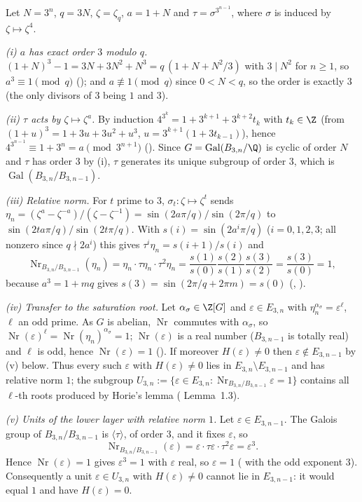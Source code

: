 Let $N=3^n$, $q=3N$, $\zeta=\zeta_q$, $a=1+N$ and $\tau=\sigma^{3^{n-1}}$, where $\sigma$ is induced by $\zeta\mapsto\zeta^4$.

\emph{(i) $a$ has exact order $3$ modulo $q$.} $(1+N)^3-1=3N+3N^2+N^3=q\,(1+N+N^2/3)$ with $3\mid N^2$ for $n\ge1$, so $a^3\equiv1\pmod q$ (); and $a\not\equiv1\pmod q$ since $0<N<q$, so the order is exactly $3$ (the only divisors of $3$ being $1$ and $3$).

\emph{(ii) $\tau$ acts by $\zeta\mapsto\zeta^{a}$.} By induction $4^{3^k}=1+3^{k+1}+3^{k+2}t_k$ with $t_k\in\Z$ (from $(1+u)^3=1+3u+3u^2+u^3$, $u=3^{k+1}(1+3t_{k-1})$), hence $4^{3^{n-1}}\equiv1+3^n=a\pmod{3^{n+1}}$ (). Since $G=\operatorname{Gal}(B_{3,n}/\Q)$ is cyclic of order $N$ and $\tau$ has order $3$ by (i), $\tau$ generates its unique subgroup of order $3$, which is $\operatorname{Gal}(B_{3,n}/B_{3,n-1})$.

\emph{(iii) Relative norm.} For $t$ prime to $3$, $\sigma_t:\zeta\mapsto\zeta^t$ sends $\eta_n=(\zeta^{a}-\zeta^{-a})/(\zeta-\zeta^{-1})=\sin(2a\pi/q)/\sin(2\pi/q)$ to $\sin(2ta\pi/q)/\sin(2t\pi/q)$. With $s(i)=\sin(2a^i\pi/q)$ ($i=0,1,2,3$; all nonzero since $q\nmid 2a^i$) this gives $\tau^i\eta_n=s(i+1)/s(i)$ and
\[ \operatorname{Nr}_{B_{3,n}/B_{3,n-1}}(\eta_n)=\eta_n\cdot\tau\eta_n\cdot\tau^2\eta_n=\frac{s(1)}{s(0)}\frac{s(2)}{s(1)}\frac{s(3)}{s(2)}=\frac{s(3)}{s(0)}=1, \]
because $a^3=1+mq$ gives $s(3)=\sin(2\pi/q+2\pi m)=s(0)$ (, ).

\emph{(iv) Transfer to the saturation root.} Let $\alpha_\sigma\in\Z[G]$ and $\varepsilon\in E_{3,n}$ with $\eta_n^{\alpha_\sigma}=\varepsilon^{\ell}$, $\ell$ an odd prime. As $G$ is abelian, $\operatorname{Nr}$ commutes with $\alpha_\sigma$, so $\operatorname{Nr}(\varepsilon)^{\ell}=\operatorname{Nr}(\eta_n)^{\alpha_\sigma}=1$; $\operatorname{Nr}(\varepsilon)$ is a real number ($B_{3,n-1}$ is totally real) and $\ell$ is odd, hence $\operatorname{Nr}(\varepsilon)=1$ (). If moreover $H(\varepsilon)\ne0$ then $\varepsilon\notin E_{3,n-1}$ by (v) below. Thus every such $\varepsilon$ with $H(\varepsilon)\neq0$ lies in $E_{3,n}\setminus E_{3,n-1}$ and has relative norm $1$; the subgroup $U_{3,n}:=\{\varepsilon\in E_{3,n}:\operatorname{Nr}_{B_{3,n}/B_{3,n-1}}\varepsilon=1\}$ contains all $\ell$-th roots produced by Horie's lemma (\cite{MO13} Lemma~1.3).

\emph{(v) Units of the lower layer with relative norm $1$.} Let $\varepsilon\in E_{3,n-1}$. The Galois group of $B_{3,n}/B_{3,n-1}$ is $\langle\tau\rangle$, of order $3$, and it fixes $\varepsilon$, so
\[ \operatorname{Nr}_{B_{3,n}/B_{3,n-1}}(\varepsilon)=\varepsilon\cdot\tau\varepsilon\cdot\tau^2\varepsilon=\varepsilon^3 . \]
Hence $\operatorname{Nr}(\varepsilon)=1$ gives $\varepsilon^3=1$ with $\varepsilon$ real, so $\varepsilon=1$ ( with the odd exponent $3$). Consequently a unit $\varepsilon\in U_{3,n}$ with $H(\varepsilon)\ne0$ cannot lie in $E_{3,n-1}$: it would equal $1$ and have $H(\varepsilon)=0$.

